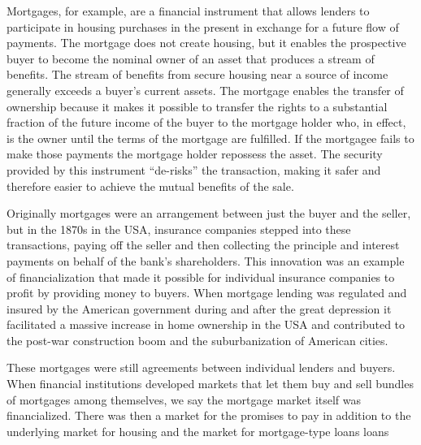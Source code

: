 Mortgages, for example, are a financial instrument that allows lenders to  participate in housing purchases in the present in exchange for a future flow of payments.  The mortgage does not create housing, but it enables the prospective buyer to become the nominal owner of an asset that produces a stream of benefits. The stream of benefits from secure housing near a source of income generally exceeds a buyer's current assets. The mortgage enables the  transfer of ownership because it makes it possible to transfer the rights to a substantial fraction of the future income of the buyer to the mortgage holder who, in effect, is the owner until the terms of the mortgage are fulfilled.  If the mortgagee fails to make those payments the mortgage holder repossess the asset. The security provided by this instrument ``de-risks'' the transaction, making it safer and therefore easier to achieve the mutual benefits of the sale.

Originally mortgages were an arrangement between just the buyer and the seller, but in the 1870s in the USA, insurance companies stepped into these transactions, paying off the seller and then collecting the principle and interest payments on behalf of the bank's shareholders. This innovation was an example of financialization that made it possible for individual insurance companies to profit by providing money to buyers. When mortgage lending was regulated and insured  by the American government during and after the great depression it facilitated a massive increase in home ownership in the USA and contributed to the post-war construction boom and the suburbanization of American cities. 

These mortgages were still agreements between individual lenders and buyers. When financial institutions developed markets that let them buy and sell bundles of mortgages among themselves, we say the mortgage market itself was financialized. There was then a market for the  promises to pay in addition to the underlying market for housing and the market for mortgage-type loans loans

